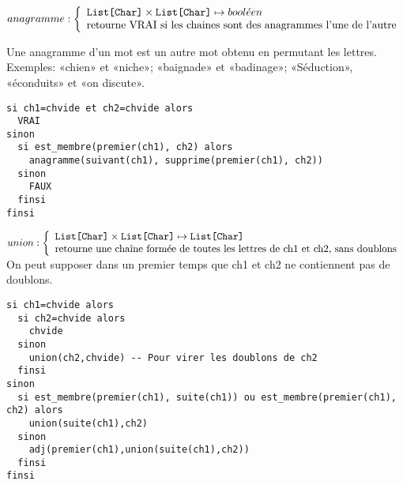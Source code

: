 \documentclass[10pt]{article}\usepackage[nu]{esial}
\begin{document}
\begin{Question}
  $anagramme: \left\{
    \begin{array}{l}
      \text{\texttt{List[Char]}}\times \text{\texttt{List[Char]}}\mapsto bool\acute{e}en\\
      \text{retourne VRAI si les chaines sont des anagrammes l'une de l'autre}
    \end{array}\right.$  

  Une anagramme d'un mot est un autre mot obtenu en permutant les lettres.
  Exemples: «chien» et «niche»; «baignade» et «badinage»; «Séduction»,
  «éconduits» et «on discute».
\end{Question}
\begin{Reponse}
  \begin{Verbatim}[label=anagramme(ch1\quotesinglbase ch2)]
si ch1=chvide et ch2=chvide alors
  VRAI
sinon
  si est_membre(premier(ch1), ch2) alors
    anagramme(suivant(ch1), supprime(premier(ch1), ch2))
  sinon
    FAUX
  finsi
finsi
  \end{Verbatim}
\end{Reponse}

\begin{Question}
  $union: \left\{
    \begin{array}{l}
      \text{\texttt{List[Char]}}\times \text{\texttt{List[Char]}}\mapsto \text{\texttt{List[Char]}}\\
      \text{retourne une chaîne formée de toutes les lettres de ch1 et ch2,
        sans doublons}
    \end{array}\right.$    
  On peut supposer dans un premier temps que ch1 et ch2 ne contiennent pas de
  doublons.
\end{Question}
\begin{Reponse}
  \begin{Verbatim}[label=union(ch1\quotesinglbase ch2)]
si ch1=chvide alors
  si ch2=chvide alors
    chvide
  sinon
    union(ch2,chvide) -- Pour virer les doublons de ch2
  finsi
sinon
  si est_membre(premier(ch1), suite(ch1)) ou est_membre(premier(ch1), ch2) alors
    union(suite(ch1),ch2)
  sinon
    adj(premier(ch1),union(suite(ch1),ch2))
  finsi
finsi    
  \end{Verbatim}
\end{Reponse}
\end{document}
